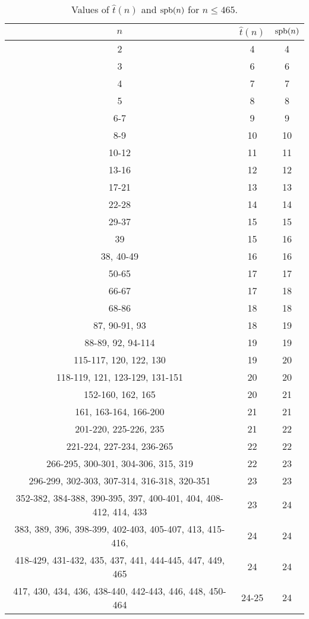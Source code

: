\begin{table}[ht]
	\centering
	\begin{tabular} {c | c c}
		$n$ & $\hat{t}(n)$ & $\mathop{\mathrm{spb}}(n)$ \\ \hline
		2 & 4 & 4 \\
		3 & 6 & 6 \\
		4 & 7 & 7 \\
		5 & 8 & 8 \\
		6-7 & 9 & 9 \\
		8-9 & 10 & 10 \\
		10-12 & 11 & 11 \\
		13-16 & 12 & 12 \\
		17-21 & 13 & 13 \\
		22-28 & 14 & 14 \\
		29-37 & 15 & 15 \\
		39 & 15 & 16 \\
		38, 40-49 & 16 & 16 \\
		50-65 & 17 & 17 \\
		66-67 & 17 & 18 \\
		68-86 & 18 & 18 \\
		87, 90-91, 93 & 18 & 19 \\
		88-89, 92, 94-114 & 19 & 19 \\
		115-117, 120, 122, 130 & 19 & 20 \\
		118-119, 121, 123-129, 131-151 & 20 & 20 \\
		152-160, 162, 165 & 20 & 21 \\
		161, 163-164, 166-200 & 21 & 21 \\
		201-220, 225-226, 235 & 21 & 22 \\
		221-224, 227-234, 236-265 & 22 & 22 \\
		266-295, 300-301, 304-306, 315, 319 & 22 & 23 \\
		296-299, 302-303, 307-314, 316-318, 320-351 & 23 & 23 \\
		352-382, 384-388, 390-395, 397, 400-401, 404, 408-412, 414, 433 & 23 & 24 \\
		383, 389, 396, 398-399, 402-403, 405-407, 413, 415-416, & 24 & 24 \\
		418-429, 431-432, 435, 437, 441, 444-445, 447, 449, 465 & 24 & 24 \\
		417, 430, 434, 436, 438-440, 442-443, 446, 448, 450-464 & 24-25 & 24
	\end{tabular}
	\caption{Values of $\hat{t}(n)$ and $\mathop{\mathrm{spb}}(n)$ for $n \leq 465$.}
	\label{tab:tp}
\end{table}


